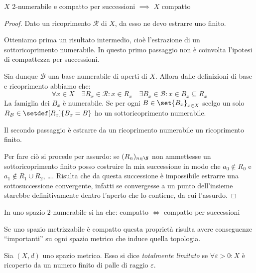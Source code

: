 \begin{prop}
	$X$ 2-numerabile e compatto per successioni $\implies$ $X$ compatto
\end{prop}

\begin{proof}
	Dato un ricoprimento $\mathcal R$ di $X$, da esso ne devo estrarre uno finito.
	
	Otteniamo prima un risultato intermedio, cioè l'estrazione di un sottoricoprimento numerabile. In questo primo passaggio non è coinvolta l'ipotesi di compattezza per successioni.
	
	Sia dunque $\mathcal B$ una base numerabile di aperti di $X$.
	Allora dalle definizioni di base e ricoprimento abbiamo che:
	\[\forall x\in X \quad
	\exists R_x \in \mathcal R : x\in R_x \quad
	\exists B_x \in \mathcal B : x\in B_x \subseteq R_x\]
	La famiglia dei $B_x$ è numerabile. Se per ogni $B\in\set{B_x}_{x\in X}$ scelgo un solo $R_B\in\setdef[R_x]{B_x=B}$ ho un sottoricoprimento numerabile.
	
	Il secondo passaggio è estrarre da un ricoprimento numerabile un ricoprimento finito.
	
	Per fare ciò si procede per assurdo: se $(R_n)_{n\in \N}$ non ammettesse un sottoricoprimento finito posso costruire la mia successione in modo che $a_0 \not \in R_0$ e $a_1 \not \in R_1 \cup R_2$, \dots . Risulta che da questa successione è impossibile estrarre una sottosuccessione convergente, infatti se convergesse a un punto dell'insieme starebbe definitivamente dentro l'aperto che lo contiene, da cui l'assurdo.
\end{proof}

\begin{cor}
In uno spazio $2$-numerabile si ha che: compatto $\iff$ compatto per successioni
\end{cor}

Se uno spazio metrizzabile è compatto questa proprietà risulta avere conseguenze ``importanti'' su ogni spazio metrico che induce quella topologia.

\begin{defn}
Sia $(X,d)$ uno spazio metrico. Esso si dice \emph{totalmente limitato} se $\forall \varepsilon > 0:X$ è ricoperto da un numero finito di palle di raggio $\varepsilon$.
\end{defn}

